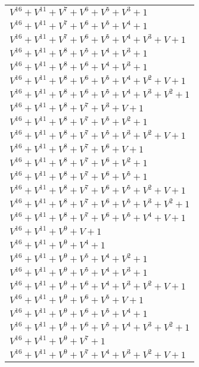 \documentclass[12pt]{article}
\begin{document}
\begin{adjustwidth}{-4cm}{}
\begin{center}
\begin{longtable}{|l|}
$V^{16}  +V^{11}  +V^{7}  +V^{6}  +V^{5}  +V^{3}  + 1$ \\
$V^{16}  +V^{11}  +V^{7}  +V^{6}  +V^{5}  +V^{4}  + 1$ \\
$V^{16}  +V^{11}  +V^{7}  +V^{6}  +V^{5}  +V^{4}  +V^{3}  + V + 1$ \\
$V^{16}  +V^{11}  +V^{8}  +V^{5}  +V^{4}  +V^{3}  + 1$ \\
$V^{16}  +V^{11}  +V^{8}  +V^{6}  +V^{4}  +V^{3}  + 1$ \\
$V^{16}  +V^{11}  +V^{8}  +V^{6}  +V^{5}  +V^{4}  +V^{2}  + V + 1$ \\
$V^{16}  +V^{11}  +V^{8}  +V^{6}  +V^{5}  +V^{4}  +V^{3}  +V^{2}  + 1$ \\
$V^{16}  +V^{11}  +V^{8}  +V^{7}  +V^{3}  + V + 1$ \\
$V^{16}  +V^{11}  +V^{8}  +V^{7}  +V^{5}  +V^{2}  + 1$ \\
$V^{16}  +V^{11}  +V^{8}  +V^{7}  +V^{5}  +V^{3}  +V^{2}  + V + 1$ \\
$V^{16}  +V^{11}  +V^{8}  +V^{7}  +V^{6}  + V + 1$ \\
$V^{16}  +V^{11}  +V^{8}  +V^{7}  +V^{6}  +V^{2}  + 1$ \\
$V^{16}  +V^{11}  +V^{8}  +V^{7}  +V^{6}  +V^{5}  + 1$ \\
$V^{16}  +V^{11}  +V^{8}  +V^{7}  +V^{6}  +V^{5}  +V^{2}  + V + 1$ \\
$V^{16}  +V^{11}  +V^{8}  +V^{7}  +V^{6}  +V^{5}  +V^{3}  +V^{2}  + 1$ \\
$V^{16}  +V^{11}  +V^{8}  +V^{7}  +V^{6}  +V^{5}  +V^{4}  + V + 1$ \\
$V^{16}  +V^{11}  +V^{9}  + V + 1$ \\
$V^{16}  +V^{11}  +V^{9}  +V^{4}  + 1$ \\
$V^{16}  +V^{11}  +V^{9}  +V^{5}  +V^{4}  +V^{2}  + 1$ \\
$V^{16}  +V^{11}  +V^{9}  +V^{5}  +V^{4}  +V^{3}  + 1$ \\
$V^{16}  +V^{11}  +V^{9}  +V^{6}  +V^{4}  +V^{3}  +V^{2}  + V + 1$ \\
$V^{16}  +V^{11}  +V^{9}  +V^{6}  +V^{5}  + V + 1$ \\
$V^{16}  +V^{11}  +V^{9}  +V^{6}  +V^{5}  +V^{4}  + 1$ \\
$V^{16}  +V^{11}  +V^{9}  +V^{6}  +V^{5}  +V^{4}  +V^{3}  +V^{2}  + 1$ \\
$V^{16}  +V^{11}  +V^{9}  +V^{7}  + 1$ \\
$V^{16}  +V^{11}  +V^{9}  +V^{7}  +V^{4}  +V^{3}  +V^{2}  + V + 1$ \\

\end{longtable}
\end{center}
\end{adjustwidth}
\end{document}
